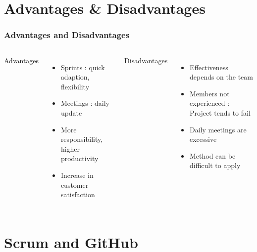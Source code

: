 \documentclass{beamer}
\begin{document}
\begin{frame}
\begin{center}
    \end{center}
    
\end{frame}



\section{Advantages \& Disadvantages}

\begin{frame}
    \frametitle{Advantages and Disadvantages}
    
    \begin{columns}
    
    Advantages
    \begin{itemize} 
    \item<2-> Sprints : quick adaption, flexibility
    \item<3-> Meetings : daily update
    \item<4-> More responsibility, higher productivity
    \item<5-> Increase in customer satisfaction
    \end{itemize}
    
    Disadvantages
    \begin{itemize}
    \item<6-> Effectiveness depends on the team
    \item<7-> Members not experienced : Project tends to fail
    \item<8-> Daily meetings are excessive
    \item<9-> Method can be difficult to apply
    \end{itemize}
    \end{columns}
\end{frame}



\section{Scrum and GitHub}
\end{document}
